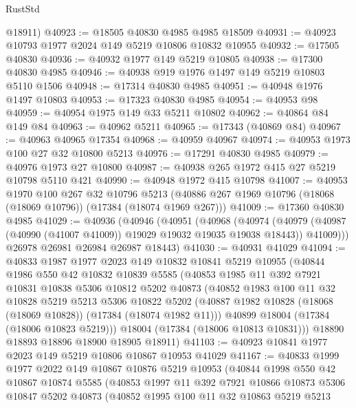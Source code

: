 \begin{lexlean}{RustStd}
\begin{coremodule}
      @18911)
@40923 := @18505 @40830 @4985 @4985 @18509
@40931 := @40923 @10793 @1977 @2024 @149 @5219 @10806 @10832 @10955
@40932 := @17505 @40830
@40936 := @40932 @1977 @149 @5219 @10805
@40938 := @17300 @40830 @4985
@40946 := @40938 @919 @1976 @1497 @149 @5219 @10803 @5110 @1506
@40948 := @17314 @40830 @4985
@40951 := @40948 @1976 @1497 @10803
@40953 := @17323 @40830 @4985
@40954 := @40953 @98
@40959 := @40954 @1975 @149 @33 @5211 @10802
@40962 := @40864 @84 @149 @84
@40963 := @40962 @5211
@40965 := @17343 (@40869 @84)
@40967 := @40963 @40965 @17354
@40968 := @40959 @40967
@40974 := @40953 @1973 @100 @27 @32 @10800 @5213
@40976 := @17291 @40830 @4985
@40979 := @40976 @1973 @27 @10800
@40987 := @40938 @265 @1972 @415 @27 @5219 @10798 @5110 @421
@40990 := @40948 @1972 @415 @10798
@41007 := @40953
    @1970
    @100
    @267
    @32
    @10796
    @5213
    (@40886 @267 @1969 @10796 (@18068 (@18069 @10796)) (@17384 (@18074 @1969 @267)))
@41009 := @17360 @40830 @4985
@41029 := @40936
    (@40946
      (@40951
        (@40968
          (@40974
            (@40979 (@40987 (@40990 (@41007 @41009)) @19029 @19032 @19035 @19038 @18443))
            @41009)))
      @26978
      @26981
      @26984
      @26987
      @18443)
@41030 := @40931 @41029
@41094 := @40833
    @1987
    @1977
    @2023
    @149
    @10832
    @10841
    @5219
    @10955
    (@40844
      @1986
      @550
      @42
      @10832
      @10839
      @5585
      (@40853
        @1985
        @11
        @392
        @7921
        @10831
        @10838
        @5306
        @10812
        @5202
        @40873
        (@40852
          @1983
          @100
          @11
          @32
          @10828
          @5219
          @5213
          @5306
          @10822
          @5202
          (@40887 @1982 @10828 (@18068 (@18069 @10828)) (@17384 (@18074 @1982 @11)))
          @40899
          @18004
          (@17384 (@18006 @10823 @5219)))
        @18004
        (@17384 (@18006 @10813 @10831)))
      @18890
      @18893
      @18896
      @18900
      @18905
      @18911)
@41103 := @40923 @10841 @1977 @2023 @149 @5219 @10806 @10867 @10953 @41029
@41167 := @40833
    @1999
    @1977
    @2022
    @149
    @10867
    @10876
    @5219
    @10953
    (@40844
      @1998
      @550
      @42
      @10867
      @10874
      @5585
      (@40853
        @1997
        @11
        @392
        @7921
        @10866
        @10873
        @5306
        @10847
        @5202
        @40873
        (@40852
          @1995
          @100
          @11
          @32
          @10863
          @5219
          @5213

\end{coremodule}
\end{lexlean}
